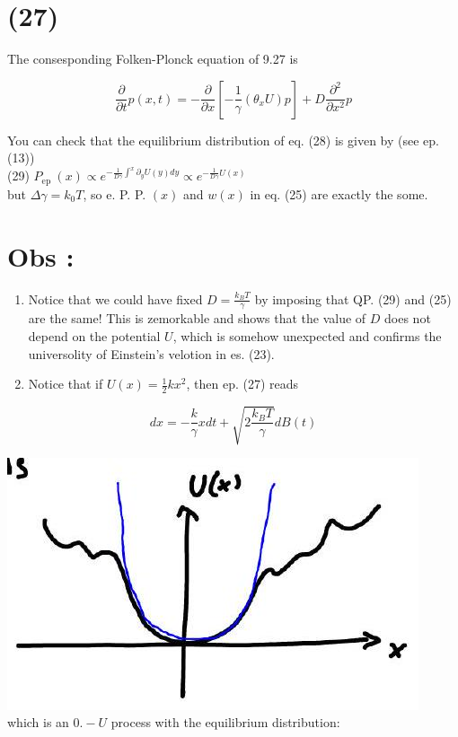 \documentclass[10pt]{article}
\begin{document}
\section*{(27)}
The consesponding Folken-Plonck equation of 9.27 is


\begin{equation*}
\frac{\partial}{\partial t} p(x, t)=-\frac{\partial}{\partial x}\left[-\frac{1}{\gamma}\left(\theta_{x} U\right) p\right]+D \frac{\partial^{2}}{\partial x^{2}} p \tag{28}
\end{equation*}


You can check that the equilibrium distribution of eq. (28) is given by (see ep. (13))\\
(29) $P_{\text {ep }}(x) \propto e^{-\frac{1}{D \gamma} \int^{x} \partial_{y} U(y) d y} \propto e^{-\frac{1}{D \gamma} U(x)}$\\
but $\Delta \gamma=k_{0} T$, so e. P. P. $(x)$ and $w(x)$ in eq. (25) are exactly the some.

\section*{Obs :}
\begin{enumerate}
  \item Notice that we could have fixed $D=\frac{k_{B} T}{\gamma}$ by imposing that QP. (29) and (25) are the same! This is zemorkable and shows that the value of $D$ does not depend on the potential $U$, which is somehow unexpected and confirms the universolity of Einstein's velotion in es. (23).
  \item Notice that if $U(x)=\frac{1}{2} k x^{2}$, then ep. (27) reads
\end{enumerate}

$$
d x=-\frac{k}{\gamma} x d t+\sqrt{2 \frac{k_{B} T}{\gamma}} d B(t)
$$

\includegraphics[max width=\textwidth, center]{2025_10_17_15d569b79a40ed74679eg-15}\\
which is an $0 .-U$ process with the equilibrium distribution:
\end{document}
